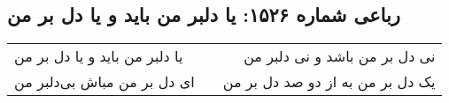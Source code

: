 \begin{center}
\section*{رباعی شماره ۱۵۲۶: یا دلبر من باید و یا دل بر من}
\label{sec:1526}
\begin{longtable}{l p{0.5cm} r}
یا دلبر من باید و یا دل بر من
&&
نی دل بر من باشد و نی دلبر من
\\
ای دل بر من مباش بی‌دلبر من
&&
یک دل بر من به از دو صد دل بر من
\\
\end{longtable}
\end{center}

